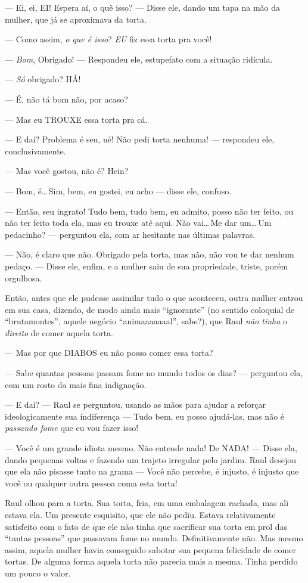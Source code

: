 --- Ei, ei, EI! Espera aí, o quê isso? --- Disse ele, dando um tapa na mão da mulher, que já se aproximava da torta.

--- Como assim, \emph{o que é isso}? \emph{EU} fiz essa torta pra você!

--- \emph{Bom}, Obrigado! --- Respondeu ele, estupefato com a situação ridícula.

--- \emph{Só} obrigado? HÁ!

--- É, não tá bom não, por acaso?

--- Mas eu TROUXE essa torta pra cá.

--- E daí? Problema é seu, ué! Não pedi torta nenhuma! --- respondeu ele, conclusivamente.

--- Mas você gostou, não é? Hein?

--- Bom, é\ldots\,Sim, bem, eu gostei, eu acho --- disse ele, confuso.

--- Então, seu ingrato! Tudo bem, tudo bem, eu admito, posso não ter feito, ou não ter feito toda ela, mas eu trouxe até aqui. Não vai\ldots\,Me dar um\ldots\,Um pedacinho? --- perguntou ela, com ar hesitante nas últimas palavras.

--- Não, é claro que não. Obrigado pela torta, mas não, não vou te dar nenhum pedaço. --- Disse ele, enfim, e a mulher saiu de sua propriedade, triste, porém orgulhosa.

Então, antes que ele pudesse assimilar tudo o que aconteceu, outra mulher entrou em sua casa, dizendo, de modo ainda mais ``ignorante'' (no sentido coloquial de ``brutamontes'', aquele negócio ``animaaaaaaal'', sabe?), que Raul \emph{não tinha} o \emph{direito} de comer aquela torta.

--- Mas por que DIABOS eu não posso comer essa torta?

--- Sabe quantas pessoas passam fome no mundo todos os dias? --- perguntou ela, com um rosto da mais fina indignação.

--- E daí? --- Raul se perguntou, usando as mãos para ajudar a reforçar ideologicamente sua indiferença --- Tudo bem, eu posso ajudá-las, mas não é \emph{passando fome} que eu vou fazer isso!

--- Você é um grande idiota mesmo. Não entende nada! De NADA! --- Disse ela, dando pequenas voltas e fazendo um trajeto irregular pelo jardim. Raul desejou que ela não pisasse tanto na grama --- Você não percebe, é injusto, é injusto que você ou qualquer outra pessoa coma esta torta!

Raul olhou para a torta. Sua torta, fria, em uma embalagem rachada, mas ali estava ela. Um presente esquisito, que ele não pediu. Estava relativamente satisfeito com o fato de que ele não tinha que sacrificar sua torta em prol das ``tantas pessoas'' que passavam fome no mundo. Definitivamente não. Mas mesmo assim, aquela mulher havia conseguido sabotar sua pequena felicidade de comer tortas. De alguma forma aquela torta não parecia mais a mesma. Tinha perdido um pouco o valor.

